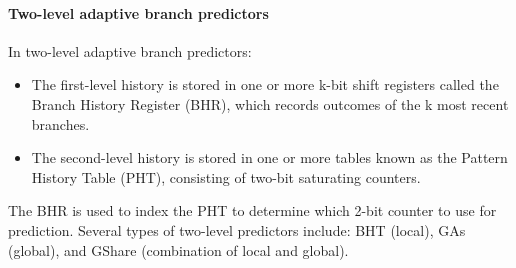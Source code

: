 \paragraph*{Two-level adaptive branch predictors}
In two-level adaptive branch predictors:
\begin{itemize}
    \item The first-level history is stored in one or more k-bit shift registers called the Branch History Register (BHR), which records outcomes of the k most recent branches.
    \item The second-level history is stored in one or more tables known as the Pattern History Table (PHT), consisting of two-bit saturating counters.
\end{itemize}
The BHR is used to index the PHT to determine which 2-bit counter to use for prediction.
Several types of two-level predictors include: BHT (local), GAs (global), and GShare (combination of local and global).